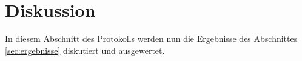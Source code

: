 \chapter{Diskussion}
\label{sec:diskussion}
In diesem Abschnitt des Protokolls werden nun die Ergebnisse des Abschnittes \ref{sec:ergebnisse} diskutiert und ausgewertet.\\\\


  

 







